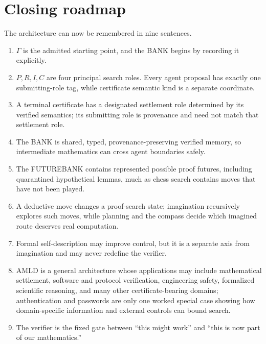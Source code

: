 \documentclass[11pt,openany]{book}
\theoremstyle{definition}
\theoremstyle{remark}
\begin{document}
\chapter*{Closing roadmap}
The architecture can now be remembered in nine sentences.
\begin{enumerate}
\item $\Gamma$ is the admitted starting point, and the BANK begins by recording it explicitly.
\item $P,R,I,C$ are four principal search roles. Every agent proposal has exactly one submitting-role tag, while certificate semantic kind is a separate coordinate.
\item A terminal certificate has a designated settlement role determined by its verified semantics; its submitting role is provenance and need not match that settlement role.
\item The BANK is shared, typed, provenance-preserving verified memory, so intermediate mathematics can cross agent boundaries safely.
\item The FUTUREBANK contains represented possible proof futures, including quarantined hypothetical lemmas, much as chess search contains moves that have not been played.
\item A deductive move changes a proof-search state; imagination recursively explores such moves, while planning and the compass decide which imagined route deserves real computation.
\item Formal self-description may improve control, but it is a separate axis from imagination and may never redefine the verifier.
\item AMLD is a general architecture whose applications may include mathematical settlement, software and protocol verification, engineering safety, formalized scientific reasoning, and many other certificate-bearing domains; authentication and passwords are only one worked special case showing how domain-specific information and external controls can bound search.
\item The verifier is the fixed gate between ``this might work'' and ``this is now part of our mathematics.''
\end{enumerate}
\end{document}
